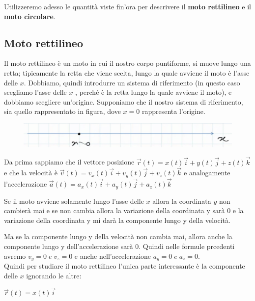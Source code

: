 Utilizzeremo adesso le quantità viste fin'ora per descrivere il \textbf{moto rettilineo} e il \textbf{moto circolare}.

\subsection{Moto rettilineo}
Il moto rettilineo è un moto in cui il nostro corpo puntiforme, 
si muove lungo una retta; tipicamente la retta che viene scelta, 
lungo la quale avviene il moto è l'asse delle $ x $.
Dobbiamo, quindi introdurre un sistema di riferimento 
(in questo caso scegliamo l'asse delle $ x $ , 
perché è la retta lungo la quale avviene il moto),
 e dobbiamo scegliere un'origine.
\newpage
Supponiamo che il nostro sistema di riferimento, 
sia quello rappresentato in figura, dove $ x = 0 $ 
rappresenta l'origine.

\begin{figure}[h]
\begin{center}
\includegraphics[width = 0.5 \textwidth]{lezione2/images/rettilineo1}
\label{fig:rettilineo1}
\end{center}
\end{figure}

Da prima sappiamo che il vettore posizione 
$\overrightarrow{r}(t)=x(t)\overrightarrow{i}+y(t)\overrightarrow{j}+z(t)\overrightarrow{k} $
e che la velocità è 
$\overrightarrow{v}(t)=v_{x}(t)\overrightarrow{i}+v_y(t)\overrightarrow{j}+v_z(t)\overrightarrow{k}$
e analogamente l'accelerazione
$\overrightarrow{a}(t)=a_{x}(t)\overrightarrow{i}+a_y(t)\overrightarrow{j}+a_z(t)\overrightarrow{k}$

Se il moto avviene solamente lungo l'asse delle $x$ allora la coordinata $y$
non cambierà mai e se non cambia allora la variazione della coordinata y sarà $0$
e la variazione della coordinata y mi darà la componente lungo 
y della velocità. 

Ma se la componente lungo y della velocità non cambia mai, allora anche la
componente lungo y dell'accelerazione sarà $0$.
Quindi nelle formule prcedenti avremo $v_y=0 \; e \;  v_z=0$
e anche nell'accelerazione $a_y=0 \; e \; a_z=0$.\\

Quindi per studiare il moto rettilineo l'unica parte interessante
è la componente delle $x$ ignorando le altre:

$\overrightarrow{r}(t)=x(t)\overrightarrow{i}$

